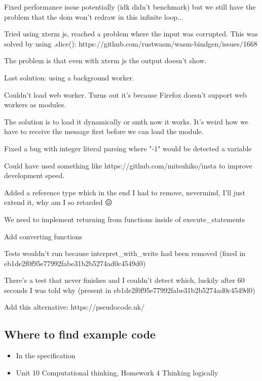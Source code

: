 \documentclass{article}
\begin{document}
Fixed performance issue potentially (idk didn't benchmark) but we still have
the problem that the dom won't redraw in this infinite loop...

Tried using xterm js, reached a problem where the input was corrupted. This was
solved by using .slice(): https://github.com/rustwasm/wasm-bindgen/issues/1668

The problem is that even with xterm js the output doesn't show.

Last solution: using a background worker.

Couldn't load web worker. Turns out it's because Firefox doesn't support web
workers as modules.

The solution is to load it dynamically or smth now it works. It's weird how we
have to receive the message first before we can load the module.

Fixed a bug with integer literal parsing where "-1" would be detected a
variable

Could have used something like https://github.com/mitsuhiko/insta to improve
development speed.

Added a reference type which in the end I had to remove, nevermind, I'll just
extend it, why am I so retarded 😖

We need to implement returning from functions inside of execute\_statements

Add converting functions

Tests wouldn't run because interpret\_with\_write had been removed (fixed in
eb1de2f0f95e77992fabe31b2b5274ad0c4549d0)

There's a test that never finishes and I couldn't detect which, luckily after
60 seconds I was told why (present in eb1de2f0f95e77992fabe31b2b5274ad0c4549d0)

Add this alternative: https://pseudocode.uk/

\subsection{Where to find example code}

\begin{itemize}
	\item In the specification
	\item Unit 10 Computational thinking, Homework 4 Thinking logically
\end{itemize}

\printbibliography[heading=bibintoc]
\end{document}
